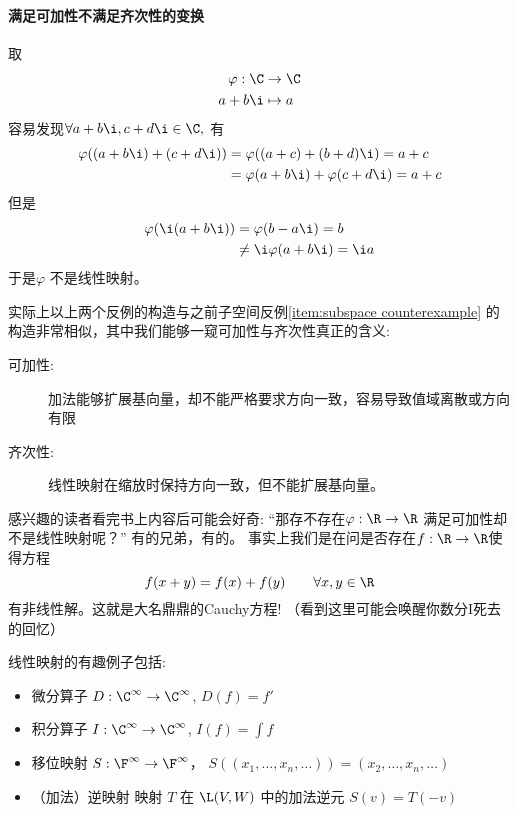 \paragraph{满足可加性不满足齐次性的变换}
取
\begin{align*}
    \varphi: \C &\to \C \\
    a+b \i &\mapsto a
\end{align*}
容易发现\(\forall a+b\i,c+d\i \in \C,\) 有
\begin{align*}
    \varphi((a+b\i)+(c+d\i)) &= \varphi((a+c)+(b+d)\i) = a+c \\
    &=\varphi(a+b\i) + \varphi(c+d\i) =a+c
\end{align*}
但是
\begin{align*}
    \varphi(\i(a+b\i)) &= \varphi(b-a\i) = b \\
    &\neq \i\varphi(a+b\i) =\i a
\end{align*}
于是\(\varphi\) 不是线性映射。

实际上以上两个反例的构造与之前子空间反例\ref{item:subspace
counterexample}
的构造非常相似，其中我们能够一窥可加性与齐次性真正的含义:
\begin{description}
    \item[可加性:] 加法能够扩展基向量，却不能严格要求方向一致，容易导致值域离散或方向有限
    \item[齐次性:] 线性映射在缩放时保持方向一致，但不能扩展基向量。
\end{description}

感兴趣的读者看完书上内容后可能会好奇: ``那存不存在\(\varphi: \R \to
\R\) 满足可加性却不是线性映射呢？'' 有的兄弟，有的。
事实上我们是在问是否存在\(f:\R \to \R\)使得方程
\[
    f(x+y) = f(x) + f(y) \qquad \forall x,y \in \R
\]
有非线性解。这就是大名鼎鼎的Cauchy方程! （看到这里可能会唤醒你数分I死去的回忆）

线性映射的有趣例子包括:
\begin{itemize}
    \item 微分算子 \(D: \C^{\infty} \to
        \C^{\infty}\), \(D(f) = f'\)
    \item 积分算子 \(I: \C^{\infty} \to
        \C^{\infty}\), \(I(f) = \int f\)
    \item 移位映射 \(S: \F^{\infty} \to \F^{\infty}\)，
        \(S((x_{1},\dots, x_{n}, \dots)) = (x_{2},\dots,
        x_{n}, \dots)\)
    \item （加法）逆映射 映射 \(T\) 在 \(\L(V,W)\) 中的加法逆元
        \(S(v)=T(-v)\)
\end{itemize}
